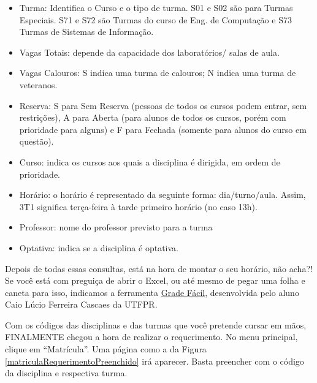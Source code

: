 \documentclass[a4paper,12pt,openany]{article}
\begin{document}
\begin{itemize}
\item Turma: Identifica o Curso e o tipo de turma. S01 e S02 são para Turmas Especiais. S71 e S72 são Turmas do curso de Eng. de Computação e S73 Turmas de Sistemas de Informação.

\item Vagas Totais: depende da capacidade dos laboratórios/ salas de aula.

\item Vagas Calouros: S indica uma turma de calouros; N indica uma turma de veteranos.

\item Reserva: S para Sem Reserva (pessoas de todos os cursos podem entrar, sem restrições), A para Aberta (para alunos de todos os cursos, porém com prioridade para alguns) e F para Fechada (somente para alunos do curso em questão).

\item Curso: indica os cursos aos quais a disciplina é dirigida, em ordem de prioridade.

\item Horário: o horário é representado da seguinte forma: dia/turno/aula. Assim, 3T1 significa terça-feira à tarde primeiro horário (no caso 13h).

\item Professor: nome do professor previsto para a turma

\item Optativa: indica se a disciplina é optativa.

\end{itemize}

	

Depois de todas essas consultas, está na hora de montar o seu horário, não acha?! Se você está com preguiça de abrir o Excel, ou até mesmo de pegar uma folha e caneta para isso, indicamos a ferramenta \href{http://www.caiux.net/utfpr/}{Grade Fácil}, desenvolvida pelo aluno Caio Lúcio Ferreira Cascaes  da UTFPR.

Com os códigos das disciplinas e das turmas que você pretende cursar em mãos, FINALMENTE chegou a hora de realizar o requerimento. No menu principal, clique em ``Matrícula''. Uma página como a da Figura \ref{matriculaRequerimentoPreenchido} irá aparecer. Basta preencher com o código da disciplina e respectiva turma.
\end{document}
